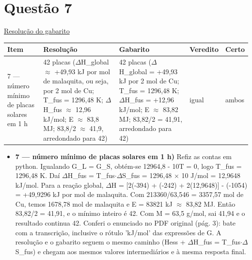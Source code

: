 \documentclass{article}%
\begin{document}
\section*{Questão 7}%
\href{https://poliedroresolve.sistemapoliedro.com.br/vestibulares/ime/2026/ime-2-fase-dia-3-25-10-2025-2-fase-dia-3/dissertativa-7-quimica-2-fase-dia-3-ime-2026}{Resolução do gabarito}\par\smallskip%
\begin{longtable}{@{}p{} p{} p{} p{} p{}@{}}\toprule Item & Resolução & Gabarito & Veredito & Certo \\ \midrule
7 --- número mínimo de placas solares em 1 h & 42 placas ($\Delta$H\_global $\approx$ +49,93 kJ por mol de malaquita, ou seja, por 2 mol de Cu; T\_fus = 1296,48 K; $\Delta$H\_fus $\approx$ 12,96 kJ/mol; E $\approx$ 83,8 MJ; 83,8/2 $\approx$ 41,9, arredondado para 42) & 42 placas ($\Delta$H\_global = +49,93 kJ por 2 mol de Cu; T\_fus = 1296,48 K; $\Delta$H\_fus = +12,96 kJ/mol; E $\approx$ 83,82 MJ; 83,82/2 = 41,91, arredondado para 42) & igual & ambos \\
\bottomrule\end{longtable}%
\begin{itemize}%
\item%
\textbf{7 --- número mínimo de placas solares em 1 h)} Refiz as contas em python. Igualando G\_L = G\_S, obtém{-}se 12964,8 - 10T = 0, logo T\_fus = 1296,48 K. Daí $\Delta$H\_fus = T\_fus$\cdot$$\Delta$S\_fus = 1296,48 $\times$ 10 J/mol = 12,9648 kJ/mol. Para a reação global, $\Delta$H = {[}2(-394) + (-242) + 2(12,9648){]} - (-1054) = +49,9296 kJ por mol de malaquita. Com 213360/63,546 = 3357,57 mol de Cu, temos 1678,78 mol de malaquita e E = 83821 kJ $\approx$ 83,82 MJ. Então 83,82/2 = 41,91, e o mínimo inteiro é 42. Com M = 63,5 g/mol, sai 41,94 e o resultado continua 42. Conferi o enunciado no PDF original (pág. 3): bate com a transcrição, inclusive o rótulo 'kJ/mol' das expressões de G. A resolução e o gabarito seguem o mesmo caminho (Hess + $\Delta$H\_fus = T\_fus$\cdot$$\Delta$S\_fus) e chegam aos mesmos valores intermediários e à mesma resposta final.%
\end{itemize}%
\end{document}
